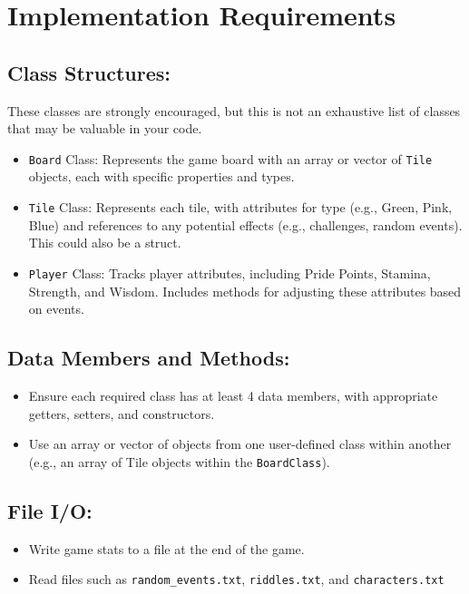 \section{\textbf{Implementation Requirements}}

\subsection{Class Structures:}
These classes are strongly encouraged, but this is not an exhaustive list of classes that may be valuable in your code. 
\begin{itemize}

    \item \texttt{Board} Class: Represents the game board with an array or vector of \texttt{Tile} objects, each with specific properties and types.
    \item \texttt{Tile} Class: Represents each tile, with attributes for type (e.g., Green, Pink, Blue) and references to any potential effects (e.g., challenges, random events). This could also be a struct.
    \item     \texttt{Player} Class: Tracks player attributes, including Pride Points, Stamina, Strength, and Wisdom. Includes methods for adjusting these attributes based on events.

\end{itemize}


\subsection{Data Members and Methods:}
\begin{itemize}
    \item Ensure each required class has at least 4 data members, with appropriate getters, setters, and constructors.
    \item Use an array or vector of objects from one user-defined class within another (e.g., an array of Tile objects within the \texttt{BoardClass}).
\end{itemize}


\subsection{File I/O:}
\begin{itemize}
    \item Write game stats to a file at the end of the game.
    \item Read files such as \verb|random_events.txt|, \verb|riddles.txt|, and \verb|characters.txt|
\end{itemize}


